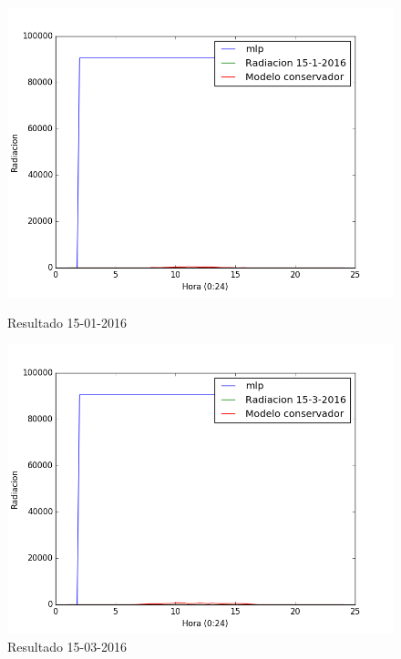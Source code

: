 \begin{figure}[htb]
		\includegraphics[width=\linewidth]{figures/mlp_2016011520160115.png}
		\caption{Resultado 15-01-2016 \label{resultado_mlp_1}}
\endminipage\hfill
{}
		\includegraphics[width=\linewidth]{figures/mlp_2016031520160315.png}
		\caption{Resultado 15-03-2016 \label{resultado_mlp_2}}
\endminipage\hfill
\end{figure}

